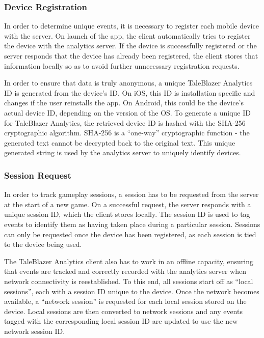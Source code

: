 \subsubsection{Device Registration}

In order to determine unique events, it is necessary to register each mobile device with the server. On launch of the app, the client automatically tries to register the device with the analytics server. If the device is successfully registered or the server responds that the device has already been registered, the client stores that information locally so as to avoid further unnecessary registration requests.

In order to ensure that data is truly anonymous, a unique TaleBlazer Analytics ID is generated from the device's ID. On iOS, this ID is installation specific and changes if the user reinstalls the app. On Android, this could be the device's actual device ID, depending on the version of the OS. To generate a unique ID for TaleBlazer Analytics, the retrieved device ID is hashed with the SHA-256 cryptographic algorithm. SHA-256 is a ``one-way'' cryptographic function - the generated text cannot be decrypted back to the original text. This unique generated string is used by the analytics server to uniquely identify devices. 

\subsubsection{Session Request}
\label{subsubsec:session_request}

In order to track gameplay sessions, a session has to be requested from the server at the start of a new game. On a successful request, the server responds with a unique session ID, which the client stores locally. The session ID is used to tag events to identify them as having taken place during a particular session. Sessions can only be requested once the device has been registered, as each session is tied to the device being used.

The TaleBlazer Analytics client also has to work in an offline capacity, ensuring that events are tracked and correctly recorded with the analytics server when network connectivity is reestablished. To this end, all sessions start off as ``local sessions'', each with a session ID unique to the device. Once the network becomes available, a ``network session'' is requested for each local session stored on the device. Local sessions are then converted to network sessions and any events tagged with the corresponding local session ID are updated to use the new network session ID. 

